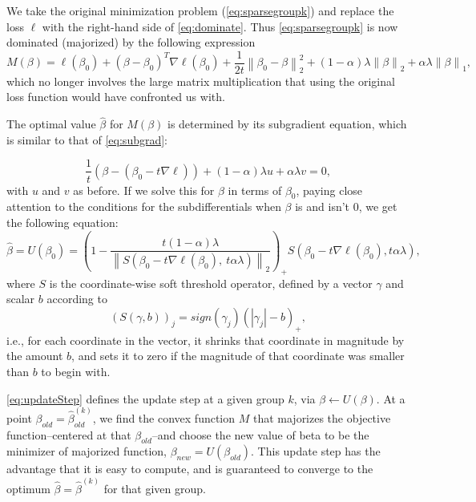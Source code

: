 \documentclass[12pt]{article}
\newcommand{\norm}[1]{\left\lVert #1 \right\rVert}
\begin{document}
We take the original minimization problem (\autoref{eq:sparsegroupk}) and replace the loss $\ell$ with the right-hand side of \autoref{eq:dominate}. Thus \autoref{eq:sparsegroupk} is now dominated (majorized) by the following expression
\begin{equation}
\label{eq:Meq}
M(\beta) = \ell(\beta_0)+(\beta - \beta_0)^T\nabla \ell(\beta_0)+\frac{1}{2t}\norm{\beta_0-\beta}_2^2+ (1-\alpha)\lambda\norm{\beta}_2+\alpha\lambda\norm{\beta}_1,
\end{equation}
which no longer involves the large matrix multiplication that using the original loss function would have confronted us with. 

The optimal value $\hat{\beta}$ for $M(\beta)$ is determined by its subgradient equation, which is similar to that of \autoref{eq:subgrad}:

\begin{equation}
\frac{1}{t} (\beta - (\beta_0 - t\nabla \ell)) +(1-\alpha)\lambda u + \alpha \lambda v = 0,
\end{equation}
with $u$ and $v$ as before. If we solve this for $\beta$ in terms of $\beta_0$, paying close attention to the conditions for the subdifferentials when $\beta$ is and isn't $0$, we get the following equation:
\begin{equation}
\hat{\beta} = U(\beta_0) =
\left(1-\frac{t(1-\alpha)\lambda}{\norm{S(\beta_0-t\nabla \ell(\beta_0),\ t\alpha\lambda)}_2}\right)_+ S(\beta_0-t\nabla \ell(\beta_0),t\alpha\lambda),
\label{eq:updateStep}
\end{equation}
where $S$ is the coordinate-wise soft threshold operator, defined by a vector $\gamma$ and scalar $b$ according to
\begin{equation}
\label{softthresh}
(S(\gamma,b))_j = sign(\gamma_j)(|\gamma_j| - b)_+,
\end{equation}
i.e., for each coordinate in the vector, it shrinks that coordinate in magnitude by the amount $b$, and sets it to zero if the magnitude of that coordinate was smaller than $b$ to begin with.



\autoref{eq:updateStep} defines the update step at a given group $k$, via $\beta \leftarrow U(\beta)$. At a point $\beta_{old} = \hat{\beta}^{(k)}_{old}$, we find the convex function $M$ that majorizes the objective function--centered at that $\beta_{old}$--and choose the new value of beta to be the minimizer of majorized function, $\beta_{new} = U(\beta_{old})$. This update step has the advantage that it is easy to compute, and is guaranteed to converge to the optimum $\hat{\beta} = \hat{\beta}^{(k)}$ for that given group.  
\end{document}
